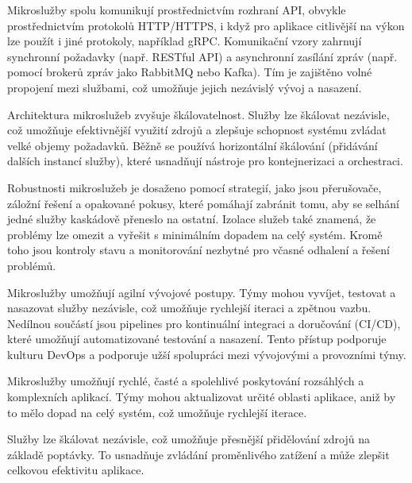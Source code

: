 

Mikroslužby spolu komunikují prostřednictvím rozhraní API, obvykle prostřednictvím protokolů HTTP/HTTPS, i když pro aplikace citlivější na výkon lze použít i jiné protokoly, například gRPC. Komunikační vzory zahrnují synchronní požadavky (např. RESTful API) a asynchronní zasílání zpráv (např. pomocí brokerů zpráv jako RabbitMQ nebo Kafka). Tím je zajištěno volné propojení mezi službami, což umožňuje jejich nezávislý vývoj a nasazení.


Architektura mikroslužeb zvyšuje škálovatelnost. Služby lze škálovat nezávisle, což umožňuje efektivnější využití zdrojů a zlepšuje schopnost systému zvládat velké objemy požadavků. Běžně se používá horizontální škálování (přidávání dalších instancí služby), které usnadňují nástroje pro kontejnerizaci a orchestraci.


Robustnosti mikroslužeb je dosaženo pomocí strategií, jako jsou přerušovače, záložní řešení a opakované pokusy, které pomáhají zabránit tomu, aby se selhání jedné služby kaskádově přeneslo na ostatní. Izolace služeb také znamená, že problémy lze omezit a vyřešit s minimálním dopadem na celý systém. Kromě toho jsou kontroly stavu a monitorování nezbytné pro včasné odhalení a řešení problémů.


Mikroslužby umožňují agilní vývojové postupy. Týmy mohou vyvíjet, testovat a nasazovat služby nezávisle, což umožňuje rychlejší iteraci a zpětnou vazbu. Nedílnou součástí jsou pipelines pro kontinuální integraci a doručování (CI/CD), které umožňují automatizované testování a nasazení. Tento přístup podporuje kulturu DevOps a podporuje užší spolupráci mezi vývojovými a provozními týmy.




Mikroslužby umožňují rychlé, časté a spolehlivé poskytování rozsáhlých a komplexních aplikací. Týmy mohou aktualizovat určité oblasti aplikace, aniž by to mělo dopad na celý systém, což umožňuje rychlejší iterace.


Služby lze škálovat nezávisle, což umožňuje přesnější přidělování zdrojů na základě poptávky. To usnadňuje zvládání proměnlivého zatížení a může zlepšit celkovou efektivitu aplikace.

